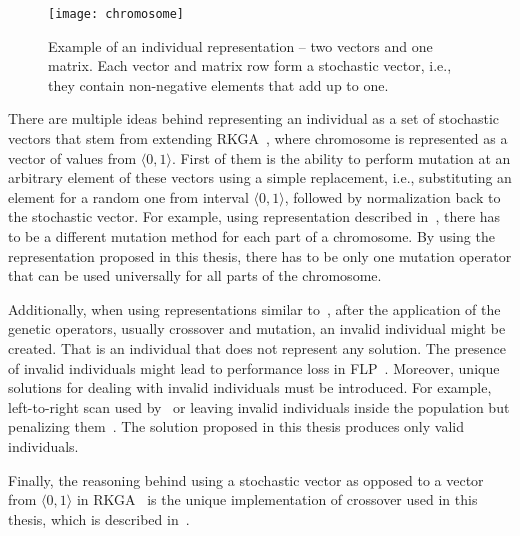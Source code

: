 \begin{figure}[htp]
    \texttt{[image: chromosome]}\caption[Example of an individual representation]{
        Example of an individual representation – two vectors and one matrix.
        Each vector and matrix row form a stochastic vector, i.e., they contain non-negative elements that add up to one.
    }
    \label{fig:chromosome}
\end{figure}

There are multiple ideas behind representing an individual as a set of stochastic vectors that stem
from extending RKGA~\cite{beanGeneticAlgorithmsRandom1994}, where chromosome is represented as a vector of values from $\langle0,1\rangle$.
First of them is the ability to perform mutation at an arbitrary element of these vectors using
a simple replacement, i.e., substituting an element for a random one from interval $\langle0,1 \rangle$,
followed by normalization back to the stochastic vector.
For example, using representation described in~\cite{friedrichIntegratedSlicingTree2018, riponAdaptiveVariableNeighborhood2013},
there has to be a different mutation method for each part of a chromosome.
By using the representation proposed in this thesis, there has to be only one mutation operator that can be used universally for all parts of the chromosome.

Additionally, when using representations similar to~\cite{friedrichIntegratedSlicingTree2018, riponAdaptiveVariableNeighborhood2013},
after the application of the genetic operators, usually crossover and mutation, an invalid individual might be created.
That is an individual that does not represent any solution.
The presence of invalid individuals might lead to performance loss in FLP~\cite{liuMultiimprovedGeneticAlgorithm2012}.
Moreover, unique solutions for dealing with invalid individuals must be introduced.
For example, left-to-right scan used by~\cite{hwangGeneticAlgorithmApproach2009, kandasamyEffectiveLocationMicro2020}
or leaving invalid individuals inside the population but penalizing them~\cite{hwangGeneticAlgorithmApproach2009}.
The solution proposed in this thesis produces only valid individuals.

Finally, the reasoning behind using a stochastic vector as opposed to a vector from $\langle0,1\rangle$ in RKGA~\cite{beanGeneticAlgorithmsRandom1994}
is the unique implementation of crossover used in this thesis, which is described in~\cite{subsec:crossover}.
